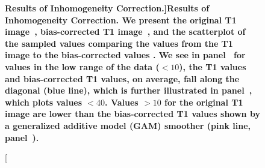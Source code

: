 \begin{figure}
   \hspace*{-0.9em}
\hfill
   \hspace*{-0.9em}
\hfill
   \hspace*{-0.9em}
\hfill
\caption[\bf Results of Inhomogeneity Correction.]{{\bf Results of Inhomogeneity Correction.}  We present the original T1 image~\protect{}, bias-corrected T1 image~\protect{}, and the scatterplot of the sampled values comparing the values from the T1 image to the bias-corrected values \protect{}.  We see in panel~\protect{} for values in the low range of the data ($< 10$), the T1 values and bias-corrected T1 values, on average, fall along the diagonal (blue line), which is further illustrated in panel~\protect{}, which plots values $< 40$.  Values $> 10$ for the original T1 image are lower than the bias-corrected T1 values shown by a generalized additive model (GAM) smoother (pink line, panel~\protect{}).  }
\label{fig:bias_correct}
\end{figure}

